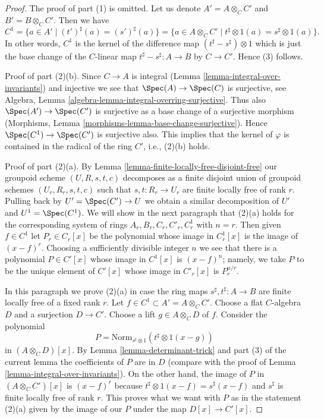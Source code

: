 \begin{proof}
The proof of part (1) is omitted. Let us denote $A' = A \otimes_C C'$ and
$B' = B \otimes_C C'$. Then we have
$$
C^1
= \{a \in A' \mid (t')^\sharp(a) = (s')^\sharp(a) \}
= \{a \in A \otimes_C C' \mid t^\sharp \otimes 1(a) = s^\sharp \otimes 1(a) \}.
$$
In other words, $C^1$ is the kernel of the difference map
$(t^\sharp - s^\sharp) \otimes 1$ which is just the base change
of the $C$-linear map $t^\sharp - s^\sharp : A \to B$ by $C \to C'$.
Hence (3) follows.

\medskip\noindent
Proof of part (2)(b). Since $C \to A$ is integral
(Lemma \ref{lemma-integral-over-invariants}) and injective we see that
$\Spec(A) \to \Spec(C)$ is surjective, see
Algebra, Lemma \ref{algebra-lemma-integral-overring-surjective}.
Thus also $\Spec(A') \to \Spec(C')$ is surjective
as a base change of a surjective morphism
(Morphisms, Lemma \ref{morphisms-lemma-base-change-surjective}).
Hence $\Spec(C^1) \to \Spec(C')$ is surjective also.
This implies that the kernel of $\varphi$ is contained in the
radical of the ring $C'$, i.e., (2)(b) holds.

\medskip\noindent
Proof of part (2)(a). By Lemma \ref{lemma-finite-locally-free-disjoint-free}
our groupoid scheme $(U, R, s, t, c)$ decomposes as a finite disjoint union
of groupoid schemes $(U_r, R_r, s, t, c)$ such that $s, t : R_r \to U_r$
are finite locally free of rank $r$. Pulling back by $U' = \Spec(C') \to U$
we obtain a similar decomposition of $U'$ and $U^1 = \Spec(C^1)$.
We will show in the next paragraph that (2)(a) holds for the corresponding
system of rings $A_r, B_r, C_r, C'_r, C^1_r$ with $n = r$.
Then given $f \in C^1$ let $P_r \in C_r[x]$ be the polynomial
whose image in $C^1_r[x]$ is the image of $(x - f)^r$.
Choosing a sufficiently divisible integer $n$ we see that
there is a polynomial $P \in C'[x]$ whose image in $C^1[x]$ is
$(x - f)^n$; namely, we take $P$ to be the unique element of
$C'[x]$ whose image in $C'_r[x]$ is $P_r^{n/r}$.

\medskip\noindent
In this paragraph we prove (2)(a) in case the ring maps
$s^\sharp, t^\sharp : A \to B$ are finite locally free of a fixed rank $r$.
Let $f \in C^1 \subset A' = A \otimes_C C'$. Choose a flat
$C$-algebra $D$ and a surjection $D \to C'$. Choose a lift
$g \in A \otimes_C D$ of $f$.
Consider the polynomial
$$
P = \text{Norm}_{s^\sharp \otimes 1}(t^\sharp \otimes 1(x - g))
$$
in $(A \otimes_C D)[x]$. By Lemma \ref{lemma-determinant-trick}
and part (3) of the current lemma the coefficients of $P$ are in $D$
(compare with the proof of Lemma \ref{lemma-integral-over-invariants}).
On the other hand, the image of $P$ in $(A \otimes_C C')[x]$ is
$(x - f)^r$ because $t^\sharp \otimes 1(x - f) = s^\sharp(x - f)$
and $s^\sharp$ is finite locally free of rank $r$.
This proves what we want with $P$ as in the statement (2)(a)
given by the image of our $P$ under the map $D[x] \to C'[x]$.
\end{proof}

